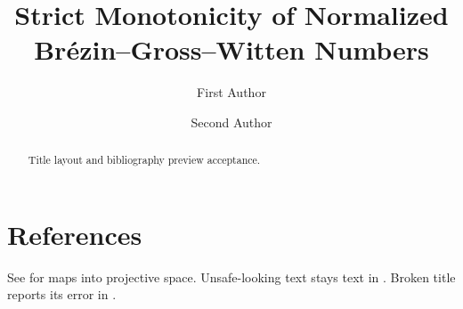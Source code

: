 \documentclass{article}
\title{Strict Monotonicity of Normalized Br\'ezin--Gross--Witten Numbers}
\author{First Author \and Second Author}
\date{}
\begin{document}
\maketitle
\begin{abstract}
Title layout and bibliography preview acceptance.
\end{abstract}
\section{References}
See \cite{vakil-zinger} for maps into projective space.
Unsafe-looking text stays text in \cite{literal-title}.
Broken title reports its error in \cite{bad-title}.

\end{document}
